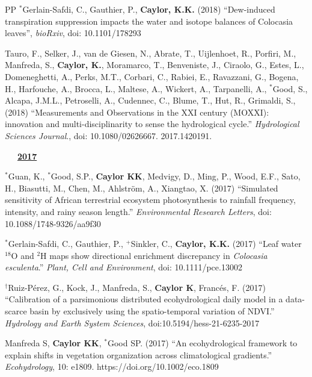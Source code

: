 \documentclass[10pt]{report}
\begin{document}
\begin{etaremune}
\item [PP] $^{*}$Gerlain-Safdi, C., Gauthier, P.,  \textbf{Caylor, K.K.} (2018) ``Dew-induced transpiration suppression impacts the water and isotope balances of Colocasia leaves'', {\em bioRxiv}, doi: 10.1101/178293

\item Tauro, F., Selker, J., van de Giesen, N., Abrate, T., Uijlenhoet, R., Porfiri, M., Manfreda, S., \textbf{Caylor, K.}, Moramarco, T., Benveniste, J., Ciraolo, G., Estes, L., Domeneghetti, A., Perks, M.T., Corbari, C., Rabiei, E., Ravazzani, G., Bogena, H., Harfouche, A., Brocca, L., Maltese, A., Wickert, A., Tarpanelli, A., $^{*}$Good, S., Alcapa, J.M.L., Petroselli, A., Cudennec, C., Blume, T., Hut, R., Grimaldi, S., (2018) ``Measurements and Observations in the XXI century (MOXXI): innovation and multi-disciplinarity to sense the hydrological cycle.'' {\em Hydrological Sciences Journal}., doi: 10.1080/02626667. 2017.1420191.


\mbox{\ \ \ \underline{\textbf{2017}}}

\item  $^{*}$Guan, K.,  $^{*}$Good, S.P.,  \textbf{Caylor KK}, Medvigy, D., Ming, P., Wood, E.F., Sato, H., Biasutti, M., Chen, M., Ahlstr{\"o}m, A., Xiangtao, X. (2017) ``Simulated sensitivity of African terrestrial ecosystem photosynthesis to rainfall frequency, intensity, and rainy season length.'' {\em Environmental Research Letters}, doi: 10.1088/1748-9326/aa9f30

\item $^{*}$Gerlain-Safdi, C., Gauthier, P.,  $^{+}$Sinkler, C.,  \textbf{Caylor, K.K.} (2017) ``Leaf water $^{18}$O and $^{2}$H maps show directional enrichment discrepancy in {\em Colocasia esculenta}.'' {\em Plant, Cell and Environment}, doi: 10.1111/pce.13002

\item $^{\dagger}$Ruiz-P\'erez, G., Kock, J., Manfreda, S., \textbf{Caylor K}, Franc\'es, F. (2017) ``Calibration of a parsimonious distributed ecohydrological daily model in a data-scarce basin by exclusively using the spatio-temporal variation of NDVI.'' {\em Hydrology and Earth System Sciences}, doi:10.5194/hess-21-6235-2017 

\item Manfreda S, \textbf{Caylor KK},  $^{*}$Good SP.  (2017) ``An ecohydrological framework to explain shifts in vegetation organization across climatological gradients.'' {\em Ecohydrology}, 10: e1809. https://doi.org/10.1002/eco.1809


\end{etaremune}
\end{document}
